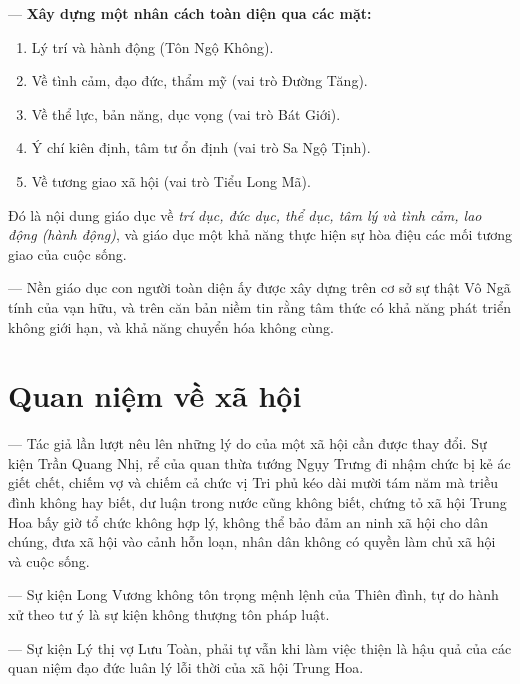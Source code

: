 --- {\bf Xây dựng một nhân cách toàn diện qua các mặt:}

\begin{enumerate}[label=\itshape\arabic*\upshape/]

    \item Lý trí và hành động (Tôn Ngộ Không).

    \item Về tình cảm, đạo đức, thẩm mỹ (vai trò Đường Tăng).

    \item Về thể lực, bản năng, dục vọng (vai trò Bát Giới).

    \item Ý chí kiên định, tâm tư ổn định (vai trò Sa Ngộ Tịnh).

    \item Về tương giao xã hội (vai trò Tiểu Long Mã).
\end{enumerate}

Đó là nội dung giáo dục về \emph{trí dục, đức dục, thể dục, tâm lý và tình cảm, lao động (hành động)}, và giáo dục một khả năng thực hiện sự hòa điệu các mối tương giao của cuộc sống.

--- Nền giáo dục con người toàn diện ấy được xây dựng trên cơ sở sự thật Vô Ngã tính của vạn hữu, và trên căn bản niềm tin rằng tâm thức có khả năng phát triển không giới hạn, và khả năng chuyển hóa không cùng.


\section{Quan niệm về xã hội} %
\label{sec:9_xa_hoi}

--- Tác giả lần lượt nêu lên những lý do của một xã hội cần được thay đổi. Sự kiện Trần Quang Nhị, rể của quan thừa tướng Ngụy Trưng đi nhậm chức bị kẻ ác giết chết, chiếm vợ và chiếm cả chức vị Tri phủ kéo dài mười tám năm mà triều đình không hay biết, dư luận trong nước cũng không biết, chứng tỏ xã hội Trung Hoa bấy giờ tổ chức không hợp lý, không thể bảo đảm an ninh xã hội cho dân chúng, đưa xã hội vào cảnh hỗn loạn, nhân dân không có quyền làm chủ xã hội và cuộc sống.

--- Sự kiện Long Vương không tôn trọng mệnh lệnh của Thiên đình, tự do hành xử theo tư ý là sự kiện không thượng tôn pháp luật.

--- Sự kiện Lý thị vợ Lưu Toàn, phải tự vẫn khi làm việc thiện là hậu quả của các quan niệm đạo đức luân lý lỗi thời của xã hội Trung Hoa.

